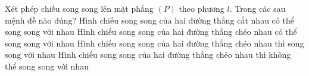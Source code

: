 

\begin{ex}%
	Xét phép chiếu song song  lên mặt phẳng $\left(P\right)$ theo phương $l$. Trong các sau mệnh đề nào đúng?
	\choice 
		{Hình chiếu song song của hai đường thẳng cắt nhau có thể song song  với nhau}
		{\True Hình chiếu song song của hai  đường thẳng chéo nhau có thể song song với nhau}
		{Hình chiếu song song của hai đường thẳng chéo nhau thì  song song với nhau}
		{Hình  chiếu song song của hai đường thẳng chéo nhau thì không thể song song với nhau}
\end{ex}



